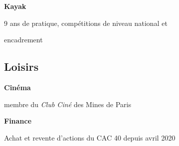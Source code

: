 \documentclass{article}
\begin{document}
\begin{multicols}{2}
\hfill

		\noindent\textbf{Kayak}

		9 ans de pratique, compétitions de niveau national et 

		encadrement

\hfill

{\color{blue} \subsection*{Loisirs}}

		\noindent\textbf{Cinéma}

		membre du \textit{Club Ciné} des Mines de Paris

\hfill

		\noindent\textbf{Finance}

		Achat et revente d'actions du CAC 40 depuis avril 2020

\end{multicols}
\end{document}

